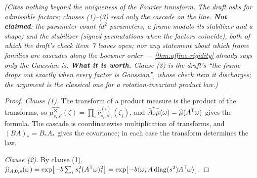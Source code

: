 \begin{proposition}
\statusT\quad\emph{(Cites nothing beyond the uniqueness of the Fourier transform. The draft
asks for admissible factors; clauses (1)--(3) read only the cascade on the line. \textbf{Not
claimed}: the parameter count ($d^2$ parameters, a frame modulo its stabilizer and a shape) and
the stabilizer (signed permutations when the factors coincide), both of which the draft's check
item~7 leaves open; nor any statement about which frame families are cascades along the Loewner
order --- \ref{thm:affine-rigidity} already says only the Gaussian is. \textbf{What it is worth.}
Clause (3) is the draft's ``the frame drops out exactly when every factor is Gaussian'', whose
check item it discharges; the argument is the classical one for a rotation-invariant product
law.)}
\end{proposition}

\begin{proof}
\leanok
\emph{Clause (1).} The transform of a product measure is the product of the transforms, so
$\widehat{\mu^\otimes_{s,s'}}(\zeta) = \prod_i\widehat\nu^{(i)}_{s_i,s'_i}(\zeta_i)$, and
$\widehat{A_*\mu}(\omega) = \widehat\mu(A^{\mathsf{T}}\omega)$ gives the formula. The cascade is
coordinatewise multiplication of transforms, and $(BA)_* = B_*A_*$ gives the covariance; in each
case the transform determines the law.

\emph{Clause (2).} By clause (1),
$\widehat\mu_{A;0,s}(\omega) = \exp\bigl[-b\sum_i s_i^2(A^{\mathsf{T}}\omega)_i^2\bigr]
= \exp\bigl[-b\langle\omega, A\operatorname{diag}(s^2)A^{\mathsf{T}}\omega\rangle\bigr]$.


\end{proof}
